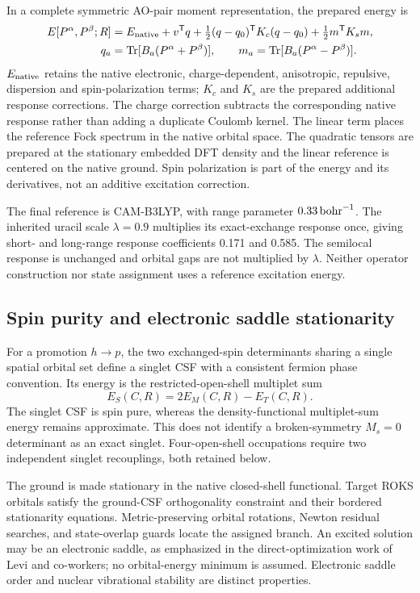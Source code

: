 \documentclass[11pt,a4paper]{article}
\begin{document}
In a complete symmetric AO-pair moment representation, the prepared energy is
\begin{align}
 E[P^\alpha,P^\beta;R]&=E_{\rm native}
 +v^{\mathsf T}q+\tfrac12(q-q_0)^{\mathsf T}K_c(q-q_0)
 +\tfrac12m^{\mathsf T}K_s m,\\
 q_a&=\operatorname{Tr}[B_a(P^\alpha+P^\beta)],\qquad
 m_a=\operatorname{Tr}[B_a(P^\alpha-P^\beta)].
\end{align}
$E_{\rm native}$ retains the native electronic, charge-dependent,
anisotropic, repulsive, dispersion and spin-polarization terms; $K_c$ and
$K_s$ are the prepared additional response corrections. The charge correction
subtracts the corresponding native response rather than adding a duplicate
Coulomb kernel. The linear term places the reference Fock spectrum in the
native orbital space. The quadratic tensors are prepared at the stationary embedded
DFT density and the linear reference is centered on the native ground.
Spin polarization is part of the energy and its derivatives, not an additive
excitation correction.

The final reference is CAM-B3LYP,\cite{camb3lyp2004} with range parameter
$0.33\,{\rm bohr}^{-1}$. The inherited uracil scale $\lambda=0.9$ multiplies
its exact-exchange response once, giving short- and long-range response
coefficients 0.171 and 0.585. The semilocal response is unchanged and orbital
gaps are not multiplied by $\lambda$. Neither operator construction nor
state assignment uses a reference excitation energy.

\subsection{Spin purity and electronic saddle stationarity}
For a promotion $h\to p$, the two exchanged-spin determinants sharing a
single spatial orbital set define a singlet CSF with a consistent fermion
phase convention. Its energy is the restricted-open-shell multiplet sum
\begin{equation}
 E_S(C,R)=2E_M(C,R)-E_T(C,R).
\end{equation}
The singlet CSF is spin pure, whereas the density-functional multiplet-sum
energy remains approximate. This does not identify a broken-symmetry
$M_s=0$ determinant as an exact singlet. Four-open-shell occupations require
two independent singlet recouplings, both retained below.

The ground is made stationary in the native closed-shell functional. Target
ROKS orbitals satisfy the ground-CSF orthogonality constraint and their
bordered stationarity equations. Metric-preserving orbital rotations,
Newton residual searches, and state-overlap guards locate the assigned
branch. An excited solution may be an electronic saddle, as emphasized in
the direct-optimization work of Levi and co-workers;\cite{levi2020,gmf2023}
no orbital-energy minimum is assumed. Electronic saddle order and nuclear
vibrational stability are distinct properties.
\end{document}
